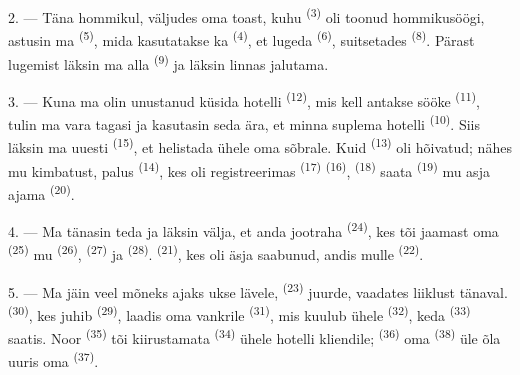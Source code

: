 2. --- Täna hommikul, väljudes oma toast, kuhu  \textsuperscript{(3)}
oli toonud hommikusöögi, astusin ma  \textsuperscript{(5)}, mida
kasutatakse ka  \textsuperscript{(4)}, et lugeda 
\textsuperscript{(6)}, suitsetades  \textsuperscript{(8)}. Pärast
lugemist läksin ma alla  \textsuperscript{(9)} ja läksin linnas jalutama.

3. --- Kuna ma olin unustanud küsida hotelli  \textsuperscript{(12)},
mis kell antakse sööke  \textsuperscript{(11)}, tulin ma vara tagasi
ja kasutasin seda ära, et minna suplema hotelli 
\textsuperscript{(10)}. Siis läksin ma uuesti  \textsuperscript{(15)},
et helistada ühele oma sõbrale. Kuid  \textsuperscript{(13)} oli hõivatud;
nähes mu kimbatust, palus  \textsuperscript{(14)}, kes oli
registreerimas  \textsuperscript{(17)} 
\textsuperscript{(16)},  \textsuperscript{(18)} saata 
\textsuperscript{(19)} mu asja ajama  \textsuperscript{(20)}.

4. --- Ma tänasin teda ja läksin välja, et anda jootraha 
\textsuperscript{(24)}, kes tõi jaamast oma  \textsuperscript{(25)} mu
 \textsuperscript{(26)},  \textsuperscript{(27)} ja
 \textsuperscript{(28)}.  \textsuperscript{(21)},
kes oli äsja saabunud, andis mulle  \textsuperscript{(22)}.

5. --- Ma jäin veel mõneks ajaks ukse lävele,  \textsuperscript{(23)}
juurde, vaadates liiklust tänaval.  \textsuperscript{(30)}, kes juhib
 \textsuperscript{(29)}, laadis oma vankrile 
\textsuperscript{(31)}, mis kuulub ühele  \textsuperscript{(32)}, keda
 \textsuperscript{(33)} saatis. Noor 
\textsuperscript{(35)} tõi kiirustamata  \textsuperscript{(34)} ühele
hotelli kliendile;  \textsuperscript{(36)} oma 
\textsuperscript{(38)} üle õla uuris oma  \textsuperscript{(37)}.

\VUsaut{4.0mm}
\VUsaut{3.0mm}

